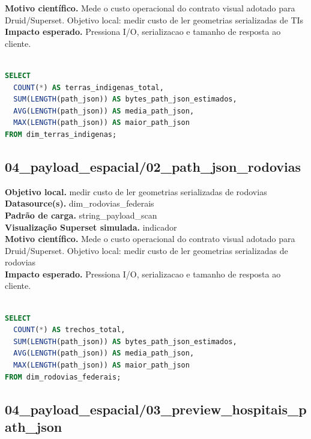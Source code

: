 \documentclass[11pt,a4paper]{article}
\begin{document}
\textbf{Motivo científico.} Mede o custo operacional do contrato visual adotado para Druid/Superset. Objetivo local: medir custo de ler geometrias serializadas de TIs\\

\textbf{Impacto esperado.} Pressiona I/O, serializacao e tamanho de resposta ao cliente.

\begin{lstlisting}[language=SQL]

SELECT
  COUNT(*) AS terras_indigenas_total,
  SUM(LENGTH(path_json)) AS bytes_path_json_estimados,
  AVG(LENGTH(path_json)) AS media_path_json,
  MAX(LENGTH(path_json)) AS maior_path_json
FROM dim_terras_indigenas;

\end{lstlisting}

\subsection{04\_payload\_espacial/02\_path\_json\_rodovias}

\textbf{Objetivo local.} medir custo de ler geometrias serializadas de rodovias\\

\textbf{Datasource(s).} dim\_rodovias\_federais\\

\textbf{Padrão de carga.} string\_payload\_scan\\

\textbf{Visualização Superset simulada.} indicador\\

\textbf{Motivo científico.} Mede o custo operacional do contrato visual adotado para Druid/Superset. Objetivo local: medir custo de ler geometrias serializadas de rodovias\\

\textbf{Impacto esperado.} Pressiona I/O, serializacao e tamanho de resposta ao cliente.

\begin{lstlisting}[language=SQL]

SELECT
  COUNT(*) AS trechos_total,
  SUM(LENGTH(path_json)) AS bytes_path_json_estimados,
  AVG(LENGTH(path_json)) AS media_path_json,
  MAX(LENGTH(path_json)) AS maior_path_json
FROM dim_rodovias_federais;

\end{lstlisting}

\subsection{04\_payload\_espacial/03\_preview\_hospitais\_path\_json}
\end{document}
